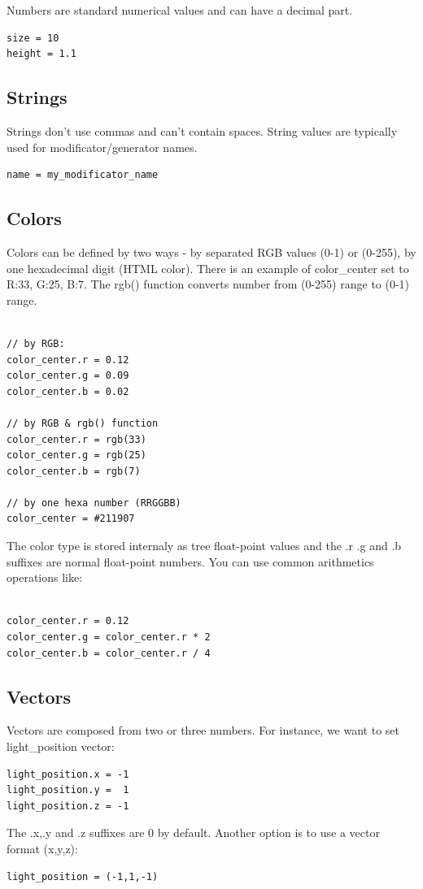 \documentclass[9pt]{article}
\begin{document}
Numbers are standard numerical values and can have a decimal part.
\begin{verbatim}
size = 10
height = 1.1
\end{verbatim}

\subsection{Strings}

Strings don't use commas and can't contain spaces. String values are typically 
used for modificator/generator names.
\begin{verbatim}
name = my_modificator_name
\end{verbatim}

\subsection{Colors}
Colors can be defined by two ways - by separated RGB values (0-1) or (0-255),
by one hexadecimal digit (HTML color). There is an example
of color\_center set to R:33, G:25, B:7. The rgb() function converts
number from (0-255) range to (0-1) range.
\begin{verbatim}

// by RGB:
color_center.r = 0.12
color_center.g = 0.09
color_center.b = 0.02

// by RGB & rgb() function
color_center.r = rgb(33)
color_center.g = rgb(25)
color_center.b = rgb(7)

// by one hexa number (RRGGBB)
color_center = #211907

\end{verbatim}

The color type is stored internaly as tree float-point values and the 
.r .g and .b suffixes are normal float-point numbers. You can use
common arithmetics operations like:

\begin{verbatim}

color_center.r = 0.12
color_center.g = color_center.r * 2
color_center.b = color_center.r / 4

\end{verbatim}

\subsection{Vectors}

Vectors are composed from two or three numbers. For instance, we want to 
set light\_position vector:
\begin{verbatim}
light_position.x = -1
light_position.y =  1
light_position.z = -1
\end{verbatim}
The .x,.y and .z suffixes are 0 by default. Another option is
to use a vector format (x,y,z):
\begin{verbatim}
light_position = (-1,1,-1)
\end{verbatim}
\end{document}
